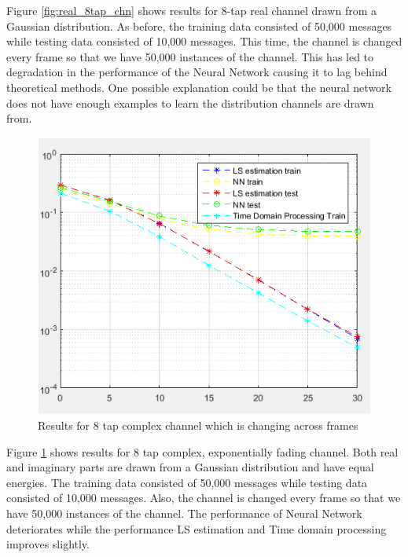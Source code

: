 Figure \ref{fig:real_8tap_chn} shows results for 8-tap real channel drawn from a Gaussian distribution. As before, the training data consisted of 50,000 messages while testing data consisted of 10,000 messages. This time, the channel is changed every frame so that we have 50,000 instances of the channel. This has led to degradation in the performance of the Neural Network causing it to lag behind theoretical methods. One possible explanation could be that the neural network does not have enough examples to learn the distribution channels are drawn from.\\
\begin{figure}[htbp]
  \centering
  \includegraphics[width=\textwidth]{./Figures/complex_8tap_res.png}
  \caption{Results for 8 tap complex channel which is changing across frames}
  \label{fig:complex_8tap_res}
\end{figure}
Figure \ref{fig:complex_8tap_res} shows results for 8 tap complex, exponentially fading channel. Both real and imaginary parts are drawn from a Gaussian distribution and have equal energies. The training data consisted of 50,000 messages while testing data consisted of 10,000 messages. Also, the channel is changed every frame so that we have 50,000 instances of the channel. The performance of Neural Network deteriorates while the performance LS estimation and Time domain processing improves slightly.\\
